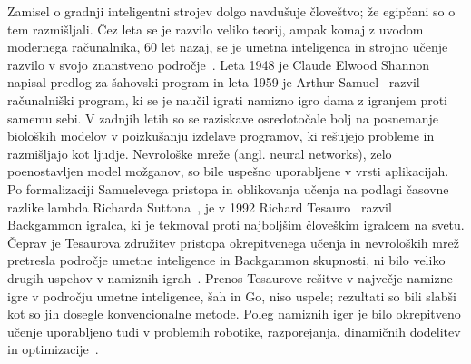 \documentclass[a4paper, oneside, 12pt]{report}
\begin{document}
Zamisel o gradnji inteligentni strojev dolgo navdušuje človeštvo; že egipčani so o tem razmišljali. Čez leta se je razvilo veliko teorij, ampak komaj z uvodom modernega računalnika, 60 let nazaj, se je umetna inteligenca in strojno učenje razvilo v svojo znanstveno področje~\cite{TDANNForStrategicControlProblems}. Leta 1948 je Claude Elwood Shannon~\cite{AMathematicalTheoryOfCommunication} napisal predlog za šahovski program in leta 1959 je Arthur Samuel~\cite{SomeStudiesInMachineLearningUsingTheGameOfCheckers} razvil računalniški program, ki se je naučil igrati namizno igro dama z igranjem proti samemu sebi. V zadnjih letih so se raziskave osredotočale bolj na posnemanje bioloških modelov v poizkušanju izdelave programov, ki rešujejo probleme in razmišljajo kot ljudje. Nevrološke mreže (angl. neural networks), zelo poenostavljen model možganov, so bile uspešno uporabljene v vrsti aplikacijah. Po formalizaciji Samuelevega pristopa in oblikovanja učenja na podlagi časovne razlike lambda Richarda Suttona~\cite{LearningToPredictByTheMethodsOfTemporalDifference}, je v 1992 Richard Tesauro~\cite{PracticalIssuesInTemporalDifferenceLearning} razvil Backgammon igralca, ki je tekmoval proti najboljšim človeškim igralcem na svetu. Čeprav je Tesaurova združitev pristopa okrepitvenega učenja in nevroloških mrež pretresla področje umetne inteligence in Backgammon skupnosti, ni bilo veliko drugih uspehov v namiznih igrah~\cite{PlayingRiskAversiveGoOnALargeBoardUsingLocalNeuralNetworkPositionEvaluationFunctions, StrategyAcquisitionForTheGameOthelloBasedOnReinforcementLearning, LearningToEvaluateGoPositionsViaTemporalDifferenceMethods}. Prenos Tesaurove rešitve v največje namizne igre v področju umetne inteligence, šah in Go, niso uspele; rezultati so bili slabši kot so jih dosegle konvencionalne metode. Poleg namiznih iger je bilo okrepitveno učenje uporabljeno tudi v problemih robotike, razporejanja, dinamičnih dodelitev in optimizacije~\cite{ReinforcementLearningAnIntroduction}.

\end{document}
